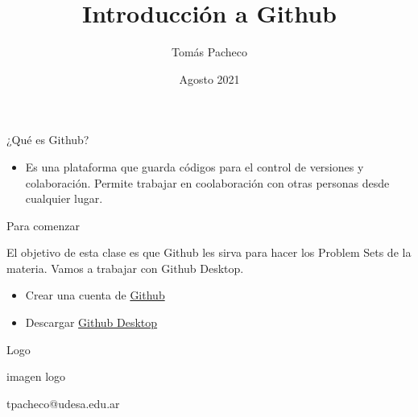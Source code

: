 \documentclass{beamer}					%
\title{Introducción a Github}
\author{Tom\'as Pacheco}
\institute{Econom\'ia Aplicada - Universidad de San Andr\'es}
\date{Agosto 2021}
\begin{document}
\begin{frame}
  \titlepage
\end{frame}

\begin{frame}{¿Qué es Github?}

\begin{itemize}
    \item Es una plataforma que guarda c\'odigos para el control de versiones y colaboraci\'on. Permite trabajar en coolaboraci\'on con otras personas desde cualquier lugar. 
\end{itemize}
\end{frame}

\begin{frame}{Para comenzar}

El objetivo de esta clase es que Github les sirva para hacer los Problem Sets de la materia. Vamos a trabajar con Github Desktop.
\begin{itemize}
    \item Crear una cuenta de \href{https://bit.ly/3kuoEd4}{Github} 
    \item Descargar \href{https://desktop.github.com/}{Github Desktop}
\end{itemize}  
\end{frame}

\begin{frame}{Logo}

\begin{center}
imagen logo
\end{center}

\end{frame}



\begin{frame}{}
\begin{huge}
\begin{center}
    tpacheco@udesa.edu.ar
\end{center}
\end{huge}
\end{frame}
\end{document}
